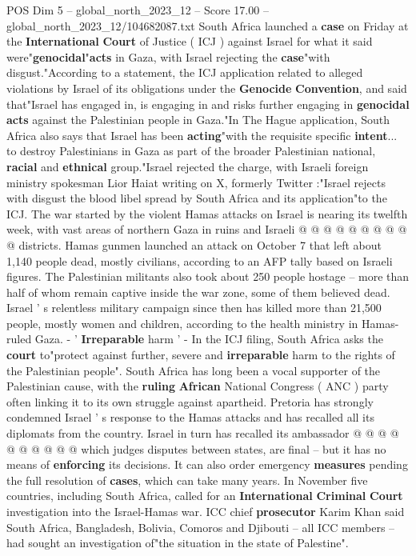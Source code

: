 \begin{textsample}{POS Dim 5 – global\_north\_2023\_12 – Score 17.00 – global\_north\_2023\_12/104682087.txt}  \label{ex:f5_pos_394}
South Africa launched a \textbf{case} on Friday at the \textbf{International} \textbf{Court} of Justice ( ICJ ) against Israel for what it said were"\textbf{genocidal}"\textbf{acts} in Gaza, with Israel rejecting the \textbf{case}"with disgust."According to a statement, the ICJ application related to alleged violations by Israel of its obligations under the \textbf{Genocide} \textbf{Convention}, and said that"Israel has engaged in, is engaging in and risks further engaging in \textbf{genocidal} \textbf{acts} against the Palestinian people in Gaza."In The Hague application, South Africa also says that Israel has been \textbf{acting}"with the requisite specific \textbf{intent}... to destroy Palestinians in Gaza as part of the broader Palestinian national, \textbf{racial} and \textbf{ethnical} group."Israel rejected the charge, with Israeli foreign ministry spokesman Lior Haiat writing on X, formerly Twitter :"Israel rejects with disgust the blood libel spread by South Africa and its application"to the ICJ.
The war started by the violent Hamas attacks on Israel is nearing its twelfth week, with vast areas of northern Gaza in ruins and Israeli @ @ @ @ @ @ @ @ @ @ districts.
Hamas gunmen launched an attack on October 7 that left about 1,140 people dead, mostly civilians, according to an AFP tally based on Israeli figures.
The Palestinian militants also took about 250 people hostage -- more than half of whom remain captive inside the war zone, some of them believed dead.
Israel ' s relentless military campaign since then has killed more than 21,500 people, mostly women and children, according to the health ministry in Hamas-ruled Gaza. - ' \textbf{Irreparable} harm ' - In the ICJ filing, South Africa asks the \textbf{court} to"protect against further, severe and \textbf{irreparable} harm to the rights of the Palestinian people".
South Africa has long been a vocal supporter of the Palestinian cause, with the \textbf{ruling} \textbf{African} National Congress ( ANC ) party often linking it to its own struggle against apartheid.
Pretoria has strongly condemned Israel ' s response to the Hamas attacks and has recalled all its diplomats from the country.
Israel in turn has recalled its ambassador @ @ @ @ @ @ @ @ @ @ which judges disputes between states, are final -- but it has no means of \textbf{enforcing} its decisions.
It can also order emergency \textbf{measures} pending the full resolution of \textbf{cases}, which can take many years.
In November five countries, including South Africa, called for an \textbf{International} \textbf{Criminal} \textbf{Court} investigation into the Israel-Hamas war.
ICC chief \textbf{prosecutor} Karim Khan said South Africa, Bangladesh, Bolivia, Comoros and Djibouti -- all ICC members -- had sought an investigation of"the situation in the state of Palestine".

\end{textsample}
